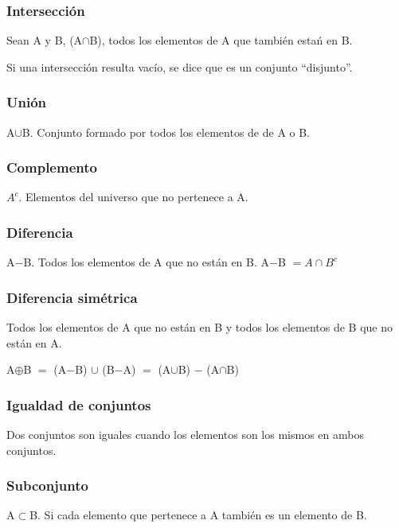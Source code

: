 \documentclass{article}
\begin{document}
\subsubsection{Intersección}

Sean A y B, (A$\cap$B), todos los elementos de A que también estań en B.
\vspace{1em}

Si una intersección resulta vacío, se dice que es un conjunto ``disjunto''.

\subsubsection{Unión}

A$\cup$B. Conjunto formado por todos los elementos de de A o B.

\subsubsection{Complemento}

$A^c$. Elementos del universo que no pertenece a A.

\subsubsection{Diferencia}

A$-$B. Todos los elementos de A que no están en B.
A$-$B $= A\cap B^c$

\subsubsection{Diferencia simétrica}
Todos los elementos de A que no están en B y todos los elementos de B que no
están en A.
\vspace{1em}

A$\oplus$B $=$ (A$-$B) $\cup$ (B$-$A) $=$ (A$\cup$B) $-$ (A$\cap$B)

\subsubsection{Igualdad de conjuntos}

Dos conjuntos son iguales cuando los elementos son los mismos en ambos conjuntos.

\subsubsection{Subconjunto}

A$\subset$B. Si cada elemento que pertenece a A también es un elemento de B.
\vspace{1em}
\end{document}

